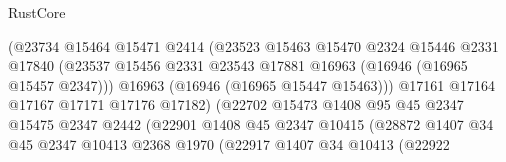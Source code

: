 \begin{lexlean}{RustCore}
\begin{coremodule}
                                      (@23734
                                        @15464
                                        @15471
                                        @2414
                                        (@23523
                                          @15463
                                          @15470
                                          @2324
                                          @15446
                                          @2331
                                          @17840
                                          (@23537
                                            @15456
                                            @2331
                                            @23543
                                            @17881
                                            @16963
                                            (@16946 (@16965 @15457 @2347)))
                                          @16963
                                          (@16946 (@16965 @15447 @15463)))
                                        @17161
                                        @17164
                                        @17167
                                        @17171
                                        @17176
                                        @17182)
                                      (@22702
                                        @15473
                                        @1408
                                        @95
                                        @45
                                        @2347
                                        @15475
                                        @2347
                                        @2442
                                        (@22901
                                          @1408
                                          @45
                                          @2347
                                          @10415
                                          (@28872
                                            @1407
                                            @34
                                            @45
                                            @2347
                                            @10413
                                            @2368
                                            @1970
                                            (@22917
                                              @1407
                                              @34
                                              @10413
                                              (@22922

\end{coremodule}
\end{lexlean}
